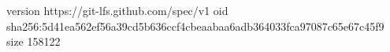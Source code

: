 version https://git-lfs.github.com/spec/v1
oid sha256:5d41ea562ef56a39cd5b636ccf4cbeaabaa6adb364033fca97087c65e67c45f9
size 158122
